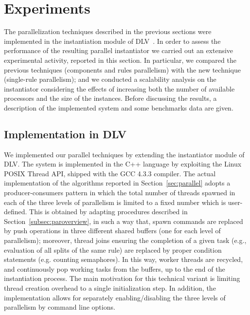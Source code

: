 \documentclass[preprint]{tlp}
\newcommand{\dlv}{{\sc DLV}\xspace}
\begin{document}
\section{Experiments}\label{sec:experiments}

The parallelization techniques described in the previous sections
were implemented in the instantiation module of DLV~\cite{leon-etal-2002-dlv}.
In order to assess the performance of the resulting parallel instantiator
we carried out an extensive experimental activity, reported in this section.
In particular, 
we compared the previous techniques (components and rules parallelism) with the new technique
(single-rule parallelism); and  we conducted
a scalability analysis on the instantiator considering  the effects of increasing both the number of available processors
and the size of the instances. Before discussing the results, a description of
the implemented system and some benchmarks data are given.

\subsection{Implementation in \dlv}

We implemented our parallel techniques by extending the instantiator module of \dlv.
The system is implemented in the C{\small ++} language by exploiting the Linux POSIX Thread API,
shipped with the GCC 4.3.3 compiler.
The actual implementation of the algorithms reported in Section~\ref{sec:parallel}
adopts a producer-consumers pattern in which the total number of threads spawned in each
of the three levels of parallelism is limited to a fixed number which is user-defined.
This is obtained by adapting procedures described in Section~\ref{subsec:paroverview},
in such a way that, spawn commands are replaced by push operations in three different shared buffers (one for each level of parallelism);
moreover, thread joins ensuring the completion of a given task (e.g., evaluation of all splits of the same rule)
are replaced by proper condition statements (e.g. counting semaphores).
In this way, worker threads are recycled, and continuously pop working tasks from the buffers, up to the end of the instantiation process.
The main motivation for this technical variant is limiting thread creation overhead to a single initialization step.
In addition, the implementation allows for separately enabling/disabling the three levels of parallelism by command line options.
\end{document}
